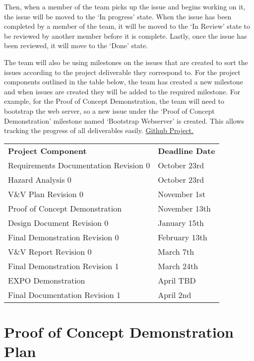\documentclass{article}
\begin{document}
Then, when a member of the team picks up the issue and begins working on it, the issue will be moved to the ‘In progress’ state. When the issue has been completed by a member of the team, it will be moved to the ‘In Review’ state to be reviewed by another member before it is complete. Lastly, once the issue has been reviewed, it will move to the ‘Done’ state. 

The team will also be using milestones on the issues that are created to sort the issues according to the project deliverable they correspond to. For the project components outlined in the table below, the team has created a new milestone and when issues are created they will be added to the required milestone. For example, for the Proof of Concept Demonstration, the team will need to bootstrap the web server, so a new issue under the ‘Proof of Concept Demonstration’ milestone named ‘Bootstrap Webserver’ is created. This allows tracking the progress of all deliverables easily. \href{https://github.com/users/AidanMariglia/projects/1/views/1}{Github Project.} 

\begin{table}[H]
\begin{tabular}{ll}
\textbf{Project Component}           & \textbf{Deadline Date} \\
Requirements Documentation Revision 0 & October 23rd  \\
Hazard Analysis 0                     & October 23rd  \\
V\&V Plan Revision 0                   & November 1st  \\
Proof of Concept Demonstration        & November 13th \\
Design Document Revision 0            & January 15th  \\
Final Demonstration Revision 0        & February 13th \\
V\&V Report Revision 0                 & March 7th     \\
Final Demonstration Revision 1        & March 24th    \\
EXPO Demonstration                    & April TBD     \\
Final Documentation Revision 1        & April 2nd     \\
\end{tabular}
\end{table}


\section{Proof of Concept Demonstration Plan}
\end{document}
